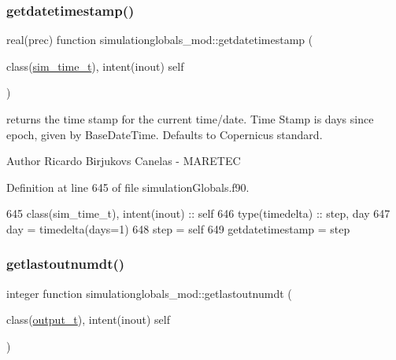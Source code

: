 \mbox{\label{namespacesimulationglobals__mod_a1fd33b50ae2216b3b7db074da1672398}} 
\subsubsection{\texorpdfstring{getdatetimestamp()}{getdatetimestamp()}}
{\footnotesize\ttfamily real(prec) function simulationglobals\+\_\+mod\+::getdatetimestamp (\begin{DoxyParamCaption}\item[{class(\mbox{\hyperlink{structsimulationglobals__mod_1_1sim__time__t}{sim\+\_\+time\+\_\+t}}), intent(inout)}]{self }\end{DoxyParamCaption})\hspace{0.3cm}{\ttfamily [private]}}



returns the time stamp for the current time/date. Time Stamp is days since epoch, given by Base\+Date\+Time. Defaults to Copernicus standard. 

\begin{DoxyAuthor}{Author}
Ricardo Birjukovs Canelas -\/ M\+A\+R\+E\+T\+EC 
\end{DoxyAuthor}


Definition at line 645 of file simulation\+Globals.\+f90.


\begin{DoxyCode}
645     \textcolor{keywordtype}{class}(sim\_time\_t), \textcolor{keywordtype}{intent(inout)} :: self
646     \textcolor{keywordtype}{type}(timedelta) :: step, day
647     day = timedelta(days=1)
648     step = self%
649     getdatetimestamp = step%
\end{DoxyCode}
\mbox{\label{namespacesimulationglobals__mod_ac643661b27d17726e0305e34370de5c3}} 
\subsubsection{\texorpdfstring{getlastoutnumdt()}{getlastoutnumdt()}}
{\footnotesize\ttfamily integer function simulationglobals\+\_\+mod\+::getlastoutnumdt (\begin{DoxyParamCaption}\item[{class(\mbox{\hyperlink{structsimulationglobals__mod_1_1output__t}{output\+\_\+t}}), intent(inout)}]{self }\end{DoxyParamCaption})\hspace{0.3cm}{\ttfamily [private]}}



